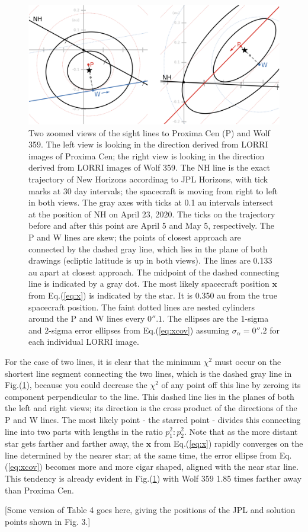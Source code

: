 \documentclass[]{aastex63}
\newcommand{\BV}[1]{\mathbf{#1}}
\begin{document}
\begin{figure}[hbtp]
\centering
\includegraphics[keepaspectratio,width=7.0 in]{nhfig2.png}
\caption{Two zoomed views of the sight lines to Proxima Cen (P) and Wolf 359.  The left view is looking in the direction derived from LORRI images of Proxima Cen; the right view is looking in the direction derived from LORRI images of Wolf 359.  The NH line is the exact trajectory of New Horizons accordinag to JPL Horizons, with tick marks at 30 day intervals; the spacecraft is moving from right to left in both views.  The gray axes with ticks at 0.1 au intervals intersect at the position of NH on April 23, 2020.  The ticks on the trajectory before and after this point are April 5 and May 5, respectively.  The P and W lines are skew; the points of closest approach are connected by the dashed gray line, which lies in the plane of both drawings (ecliptic latitude is up in both views).  The lines are 0.133 au apart at closest approach.  The midpoint of the dashed connecting line is indicated by a gray dot.  The most likely spacecraft position $\BV{x}$ from Eq.(\ref{eq:x}) is indicated by the star.  It is 0.350 au from the true spacecraft position.  The faint dotted lines are nested cylinders around the P and W lines every $0''\!\!.1.$ The ellipses are the 1-sigma and 2-sigma error ellipses from Eq.(\ref{eq:xcov}) assuming $\sigma_\alpha=0''\!\!.2$ for each individual LORRI image.}
\label{fig:nav_zoom}
\end{figure}

For the case of two lines, it is clear that the minimum $\chi^2$ must occur on the shortest line segment connecting the two lines, which is the dashed gray line in Fig.(\ref{fig:nav_zoom}), because you could decrease the $\chi^2$ of any point off this line by zeroing its component perpendicular to the line.  This dashed line lies in the planes of both the left and right views; its direction is the cross product of the directions of the P and W lines.  The most likely point - the starred point - divides this connecting line into two parts with lengths in the ratio $p_1^2:p_2^2.$ Note that as the more distant star gets farther and farther away, the $\BV{x}$ from Eq.(\ref{eq:x}) rapidly converges on the line determined by the nearer star; at the same time, the error ellipse from Eq.(\ref{eq:xcov}) becomes more and more cigar shaped, aligned with the near star line.  This tendency is already evident in Fig.(\ref{fig:nav_zoom}) with Wolf 359 1.85 times farther away than Proxima Cen.

[Some version of Table 4 goes here, giving the positions of the JPL and solution points shown in Fig. 3.]
\end{document}
